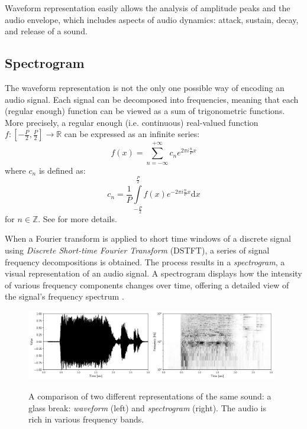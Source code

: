 Waveform representation easily allows the analysis of amplitude peaks and the audio envelope, which includes aspects of audio dynamics: attack, sustain, decay, and release of a sound.

\subsection{Spectrogram}

The waveform representation is not the only one possible way of encoding an audio signal. Each signal can be decomposed into frequencies, meaning that each (regular enough) function can be viewed as a sum of trigonometric functions. More precisely, a regular enough (i.e. continuous) real-valued function $f\colon\left[-\tfrac{P}{2},\tfrac{P}{2}\right]\to\mathbb{R}$ can be expressed as an infinite series: \[f(x) = \sum_{n=-\infty}^{+\infty}c_n e^{2\pi i\frac{n}{P}x}\] where $c_n$ is defined as: \[c_n = \frac{1}{P}\int\limits_{-\tfrac{P}{2}}^{\tfrac{P}{2}}f(x)e^{-2\pi i \frac{n}{P}x}\mbox{d}x\] for $n\in\mathbb{Z}$. See \cite[p.~185--186]{Rudin1976} for more details.

When a Fourier transform is applied to short time windows of a discrete signal using \emph{Discrete Short-time Fourier Transform} (DSTFT), a series of signal frequency decompositions is obtained. The process results in a \emph{spectrogram}, a visual representation of an audio signal. A spectrogram displays how the intensity of various frequency components changes over time, offering a detailed view of the signal's frequency spectrum \cite[p.~365--366]{Smith1999}.

\begin{figure}[ht!]
\centering
\includegraphics[width=0.49\textwidth]{images/waveform.png}\includegraphics[width=0.49\textwidth]{images/spectrogram.png}
\caption[A comparison of two different representations of the same sound.]{A comparison of two different representations of the same sound: a glass break: \emph{waveform} (left) and \emph{spectrogram} (right). The audio is rich in various frequency bands.}
\end{figure}

